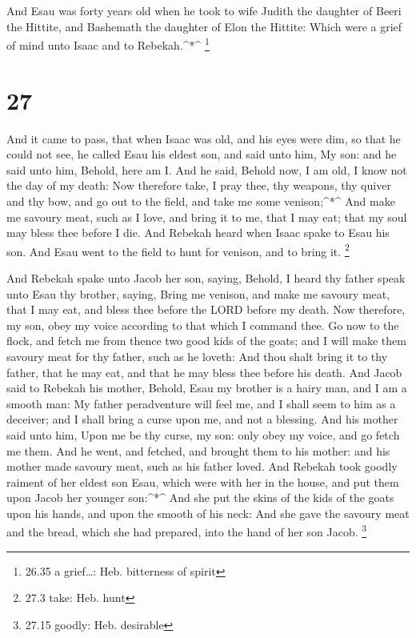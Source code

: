  And Esau was forty years old when he took to wife Judith
the daughter of Beeri the Hittite, and Bashemath the daughter of Elon
the Hittite:  Which were a grief of mind unto Isaac and to
Rebekah.\^{}*\^{} \footnote{26.35 a grief\ldots: Heb. bitterness of
  spirit}

\hypertarget{section-26}{%
\section{27}\label{section-26}}

 And it came to pass, that when Isaac was old, and his eyes
were dim, so that he could not see, he called Esau his eldest son, and
said unto him, My son: and he said unto him, Behold, here am I.
 And he said, Behold now, I am old, I know not the day of my
death:  Now therefore take, I pray thee, thy weapons, thy
quiver and thy bow, and go out to the field, and take me some
venison;\^{}*\^{}  And make me savoury meat, such as I love,
and bring it to me, that I may eat; that my soul may bless thee before I
die.  And Rebekah heard when Isaac spake to Esau his son.
And Esau went to the field to hunt for venison, and to bring it.
\footnote{27.3 take: Heb. hunt}

 And Rebekah spake unto Jacob her son, saying, Behold, I
heard thy father speak unto Esau thy brother, saying,  Bring
me venison, and make me savoury meat, that I may eat, and bless thee
before the LORD before my death.  Now therefore, my son,
obey my voice according to that which I command thee.  Go
now to the flock, and fetch me from thence two good kids of the goats;
and I will make them savoury meat for thy father, such as he loveth:
 And thou shalt bring it to thy father, that he may eat,
and that he may bless thee before his death.  And Jacob
said to Rebekah his mother, Behold, Esau my brother is a hairy man, and
I am a smooth man:  My father peradventure will feel me,
and I shall seem to him as a deceiver; and I shall bring a curse upon
me, and not a blessing.  And his mother said unto him, Upon
me be thy curse, my son: only obey my voice, and go fetch me them.
 And he went, and fetched, and brought them to his mother:
and his mother made savoury meat, such as his father loved.
 And Rebekah took goodly raiment of her eldest son Esau,
which were with her in the house, and put them upon Jacob her younger
son:\^{}*\^{}  And she put the skins of the kids of the
goats upon his hands, and upon the smooth of his neck:  And
she gave the savoury meat and the bread, which she had prepared, into
the hand of her son Jacob. \footnote{27.15 goodly: Heb. desirable}


